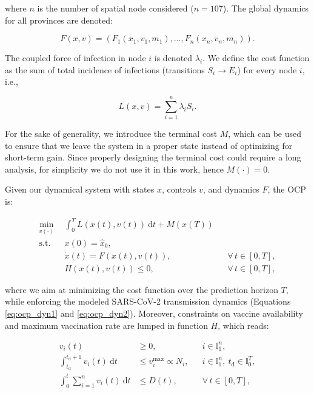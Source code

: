 where $n$ is the number of spatial node considered ($n=107$). The global dynamics for all provinces are denoted:

\begin{equation*}
    F(x,v) = (F_1(x_1,v_1, m_1),\ldots,F_n(x_n,v_n, m_n)).
\end{equation*}

The coupled force of infection in node $i$ is denoted $\lambda_i$. We define the cost function as the sum of total incidence of infections (transitions $S_i\longrightarrow E_i$) for every node $i$, i.e.,

\begin{equation*}
    L(x,v) = \sum_{i=1}^n \lambda_i S_i.
\end{equation*}

For the sake of generality, we introduce the terminal cost $M$, which can be used to ensure that we leave the system in a proper state instead of optimizing for short-term gain. Since properly designing the terminal cost could require a long analysis, for simplicity we do not use it in this work, hence $M(\cdot) = 0$.

Given our dynamical system with states $x$, controls $v$, and dynamics $F$, the OCP is:

\begin{subequations}
    \label{eq:ocp}
    \begin{align}
        \min_{v(\cdot)} \ \ & \int_{0}^{T} L(x(t),v(t)) \ \mathrm{d}t + M(x(T)) \\ \label{eq:ocp_dyn1}
        \mathrm{s.t.} \ \ & x(0) = \hat x_0, \\ \label{eq:ocp_dyn2}
        &\dot x(t) = F(x(t),v(t)), && \forall \, t\in[0,T], \\ 
        &H(x(t),v(t)) \leq 0, && \forall \, t\in[0,T],
    \end{align}
\end{subequations}

where we aim at minimizing the cost function over the prediction horizon $T$, while enforcing the modeled SARS-CoV-2 transmission dynamics (Equations \eqref{eq:ocp_dyn1} and \eqref{eq:ocp_dyn2}). Moreover, constraints on vaccine availability and maximum vaccination rate are lumped in function $H$, which reads:

\begin{subequations}
    \begin{align}
        v_i(t) &\geq 0, && i\in\mathbb{I}_1^n, \label{eq:constr_vacc} \\
        \int_{t_\mathrm{d}}^{t_\mathrm{d}+1} v_i(t) \ \mathrm{d}t &\leq v_i^\mathrm{max} \propto N_i, && i\in\mathbb{I}_1^n,\ t_\mathrm{d} \in \mathbb{I}_0^T,  \label{eq:constr_day} \\
        \int_{0}^{t} \sum_{i=1}^n v_i(t) \ \mathrm{d}t &\leq D(t), && \forall \, t\in[0,T], \label{eq:constr_week}
    \end{align}
\end{subequations}

